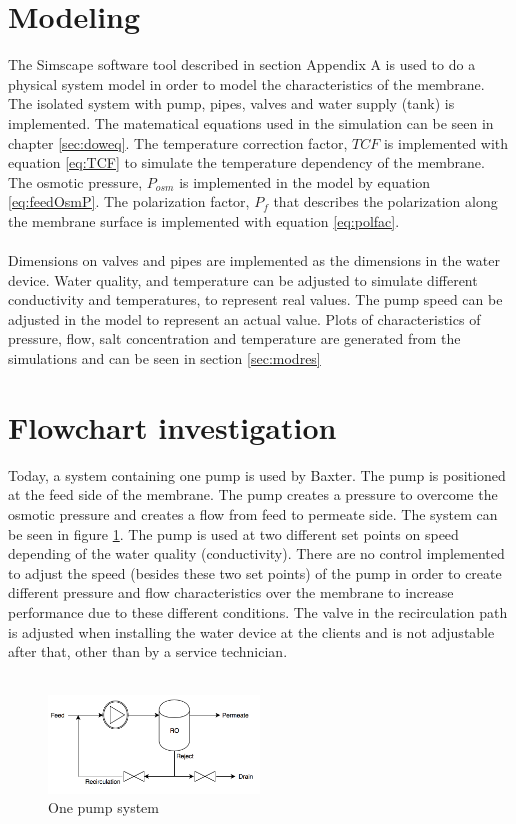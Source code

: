 \section{Modeling}
The Simscape software tool described in section Appendix A is used to do a physical system model in order to model the characteristics of the membrane. The isolated system with pump, pipes, valves and water supply (tank) is implemented. The matematical equations used in the simulation can be seen in chapter \ref{sec:doweq}. The temperature correction factor, $TCF$ is implemented with equation \ref{eq:TCF} to simulate the temperature dependency of the membrane. The osmotic pressure, $P_{osm}$ is implemented in the model by equation \ref{eq:feedOsmP}. The polarization factor, $P_{f}$ that describes the polarization along the membrane surface is implemented with equation \ref{eq:polfac}. 
\\
\\
Dimensions on valves and pipes are implemented as the dimensions in the water device. Water quality, and temperature can be adjusted to simulate different conductivity and temperatures, to represent real values. The pump speed can be adjusted in the model to represent an actual value. Plots of characteristics of pressure, flow, salt concentration and temperature are generated from the simulations and can be seen in section \ref{sec:modres}

\section{Flowchart investigation}
\label{Flowchart}
Today, a system containing one pump is used by Baxter. The pump is positioned at the feed side of the membrane. The pump creates a pressure to overcome the osmotic pressure and creates a flow from feed to permeate side. The system can be seen in figure \ref{fig:System11}. The pump is used at two different set points on speed depending of the water quality (conductivity). There are no control implemented to adjust the speed (besides these two set points) of the pump in order to create different pressure and flow characteristics over the membrane to increase performance due to these different conditions. The valve in the recirculation path is adjusted when installing the water device at the clients and is not adjustable after that, other than by a service technician.\\
\\
\begin{figure}[h]
    \centering
    \includegraphics[width=0.5\textwidth]{Sys1}
    \caption{One pump system}
    \label{fig:System11}
\end{figure}

